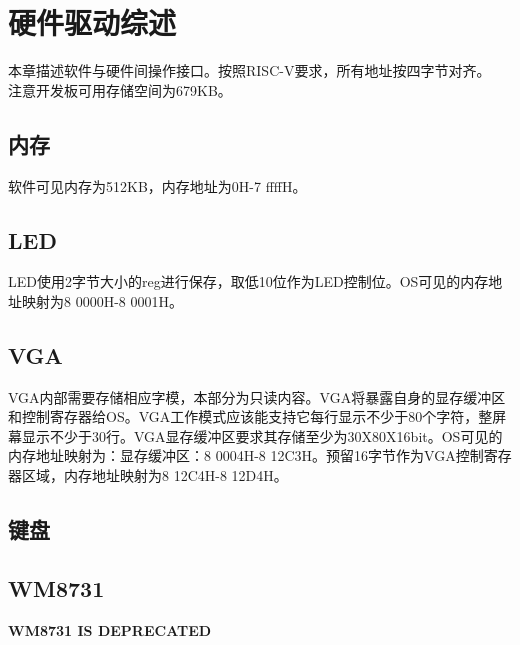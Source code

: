 %
% 
% 
% 
% 
% 
% 
%

\chapter{硬件驱动综述}
本章描述软件与硬件间操作接口。按照RISC-V要求，所有地址按四字节对齐。\\
注意开发板可用存储空间为679KB。
\section{内存}
软件可见内存为512KB，内存地址为0H-7 ffffH。
\section{LED}
LED使用2字节大小的reg进行保存，取低10位作为LED控制位。OS可见的内存地址映射为8 0000H-8 0001H。
\section{VGA}
VGA内部需要存储相应字模，本部分为只读内容。VGA将暴露自身的显存缓冲区和控制寄存器给OS。VGA工作模式应该能支持它每行显示不少于80个字符，整屏幕显示不少于30行。VGA显存缓冲区要求其存储至少为30X80X16bit。OS可见的内存地址映射为：显存缓冲区：8 0004H-8 12C3H。预留16字节作为VGA控制寄存器区域，内存地址映射为8 12C4H-8 12D4H。
\section{键盘}
\section{WM8731}
\textbf{WM8731 IS DEPRECATED}
